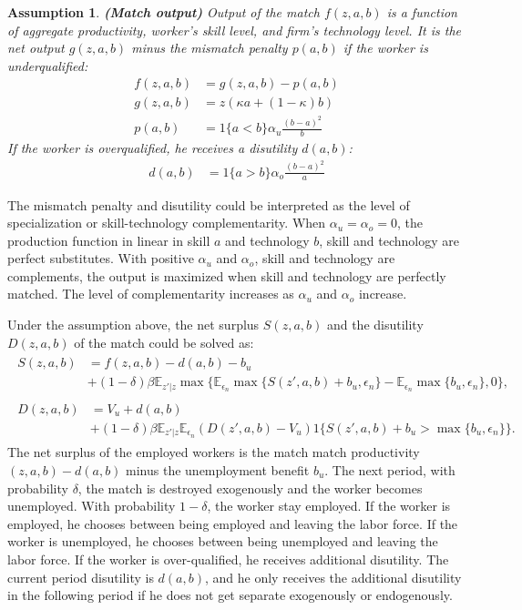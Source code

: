 \documentclass[12pt]{article}
\newtheorem{assumption}{Assumption}
\newcommand{\E}{\mathbb{E}}
\newcommand{\1}{\mathbb{1}}
\begin{document}
\begin{assumption}{\bf (Match output)}
Output of the match $f(z,a,b)$ is a function of aggregate productivity, worker's skill level, and firm's technology level. It is the net output $g(z,a,b)$ minus the mismatch penalty $p(a,b)$ if the worker is underqualified:
\begin{align*}
f(z,a,b) &= g(z,a,b)-p(a,b) \\
g(z,a,b) &= z(\kappa a+(1-\kappa) b)\\
p(a,b) &= 1\{a<b\}\alpha_u\frac{(b-a)^2}{b} 
\end{align*}
If the worker is overqualified, he receives a disutility $d(a,b)$: 
\begin{align*}
d(a,b) &= 1\{a>b\}\alpha_o\frac{(b-a)^2}{a}
\end{align*}
\end{assumption}
The mismatch penalty and disutility could be interpreted as the level of specialization or skill-technology complementarity. When $\alpha_u = \alpha_o = 0$, the production function in linear in skill $a$ and technology $b$, skill and technology are perfect substitutes. With positive $\alpha_u$ and $\alpha_o$, skill and technology are complements, the output is maximized when skill and technology are perfectly matched. The level of complementarity increases as $\alpha_u$ and $\alpha_o$ increase. 

Under the assumption above, the net surplus $S(z,a,b)$ and the disutility $D(z,a,b)$ of the match could be solved as: 
\begin{align}
\begin{split}
S(z,a,b) &= f(z,a,b)-d(a,b)-b_u \\
			 &+(1-\delta)\beta \E_{z'|z}\max\{\E_{\epsilon_n}\max\{S(z',a,b)+b_u,\epsilon_n\}-\E_{\epsilon_n}\max\{b_u,\epsilon_n\},0 \},  
\end{split} \\
\begin{split}
D(z,a,b) &=V_u+d(a,b) \\
 			 &+(1-\delta)\beta \E_{z'|z}\E_{\epsilon_n}(D(z',a,b)-V_u)1\{{S(z',a,b)+b_u>\max\{b_u,\epsilon_n\}}\}.
\end{split} 
\end{align}
The net surplus of the employed workers is the match match productivity $(z,a,b)-d(a,b)$ minus the unemployment benefit $b_u$. The next period, with probability $\delta$, the match is destroyed exogenously and the worker becomes unemployed. With probability $1-\delta$, the worker stay employed. If the worker is employed, he chooses between being employed and leaving the labor force. If the worker is unemployed, he chooses between being unemployed and leaving the labor force. If the worker is over-qualified, he receives additional disutility. The current period disutility is $d(a,b)$, and he only receives the additional disutility in the following period if he does not get separate exogenously or endogenously. 
\end{document}
